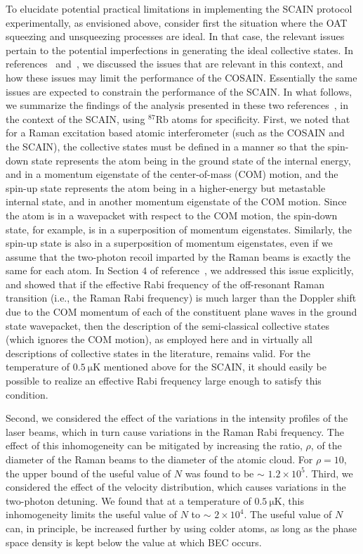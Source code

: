 \documentclass[aps,pra,letterpaper,superscriptaddress,showpacs,amsmath,floats,twocolumn]{revtex4-1}
\begin{document}
To elucidate potential practical limitations in implementing the SCAIN protocol experimentally, as envisioned above, consider first the situation where the OAT squeezing and unsqueezing processes are ideal.  In that case, the relevant issues pertain to the potential imperfections in generating the ideal collective states. In references~\cite{COSAIN} and~\cite{CollectiveDescription}, we discussed the issues that are relevant in this context, and how these issues may limit the performance of the COSAIN. Essentially the same issues are expected to constrain the performance of the SCAIN. In what follows, we summarize the findings of the analysis presented in these two references~\cite{COSAIN, CollectiveDescription}, in the context of the SCAIN, using $^{87}$Rb atoms for specificity. First, we noted that for a Raman excitation based atomic interferometer (such as the COSAIN and the SCAIN), the collective states must be defined in a manner so that the spin-down state represents the atom being in the ground state of the internal energy, and in a momentum eigenstate of the center-of-mass (COM) motion, and the spin-up state represents the atom being in a higher-energy but metastable internal state, and in another momentum eigenstate of the COM motion. Since the atom is in a wavepacket with respect to the COM motion, the spin-down state, for example, is in a superposition of momentum eigenstates. Similarly, the spin-up state is also in a superposition of momentum eigenstates, even if we assume that the two-photon recoil imparted by the Raman beams is exactly the same for each atom. In Section $4$ of reference~\cite{CollectiveDescription}, we addressed this issue explicitly, and showed that if the effective Rabi frequency of the off-resonant Raman transition (i.e., the Raman Rabi frequency) is much larger than the Doppler shift due to the COM momentum of each of the constituent plane waves in the ground state wavepacket, then the description of the semi-classical collective states (which ignores the COM motion), as employed here and in virtually all descriptions of collective states in the literature, remains valid.  For the temperature of $\SI{0.5}{\micro\kelvin}$ mentioned above for the SCAIN, it should easily be possible to realize an effective Rabi frequency large enough to satisfy this condition.  

Second, we considered the effect of the variations in the intensity profiles of the laser beams, which in turn cause variations in the Raman Rabi frequency. The effect of this inhomogeneity can be mitigated by increasing the ratio, $\rho$, of the diameter of the Raman beams to the diameter of the atomic cloud. For $\rho = 10$, the upper bound of the useful value of $N$ was found to be $\sim$ $1.2 \times 10^5$.  Third, we considered the effect of the velocity distribution, which causes variations in the two-photon detuning. We found that at a temperature of $\SI{0.5}{\micro\kelvin}$, this inhomogeneity limits the useful value of $N$ to $\sim$ $2 \times 10^4$. The useful value of $N$ can, in principle, be increased further by using colder atoms, as long as the phase space density is kept below the value at which BEC occurs.
\end{document}
